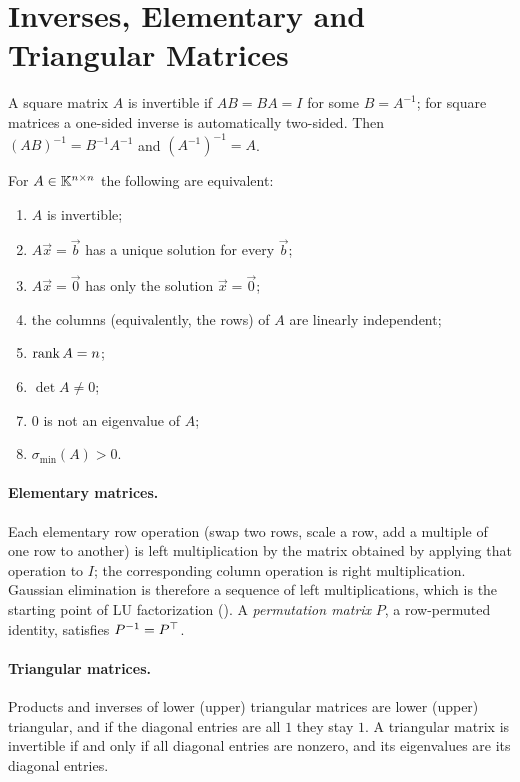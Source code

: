 \section{Inverses, Elementary and Triangular Matrices}
\label{sec:inverse}

A square matrix $A$ is invertible if $AB = BA = I$ for some $B = A^{-1}$; for square matrices a one-sided inverse is automatically two-sided. Then $(AB)^{-1} = B^{-1}A^{-1}$ and $(A^{-1})^{-1} = A$.

\begin{theorem}
  \label{thm:imt}
  For $A \in \mathbb{K}^{n \times n}$ the following are equivalent:
  \begin{enumerate}
    \item $A$ is invertible;
    \item $A\vec{x} = \vec{b}$ has a unique solution for every $\vec{b}$;
    \item $A\vec{x} = \vec{0}$ has only the solution $\vec{x} = \vec{0}$;
    \item the columns (equivalently, the rows) of $A$ are linearly independent;
    \item $\operatorname{rank} A = n$;
    \item $\det A \ne 0$;
    \item $0$ is not an eigenvalue of $A$;
    \item $\sigma_{\min}(A) > 0$.
  \end{enumerate}
\end{theorem}

\paragraph{Elementary matrices.} Each elementary row operation (swap two rows, scale a row, add a multiple of one row to another) is left multiplication by the matrix obtained by applying that operation to $I$; the corresponding column operation is right multiplication. Gaussian elimination is therefore a sequence of left multiplications, which is the starting point of LU factorization (). A \emph{permutation matrix} $P$, a row-permuted identity, satisfies $P^{-1} = P^\top$.

\paragraph{Triangular matrices.} Products and inverses of lower (upper) triangular matrices are lower (upper) triangular, and if the diagonal entries are all $1$ they stay $1$. A triangular matrix is invertible if and only if all diagonal entries are nonzero, and its eigenvalues are its diagonal entries.

